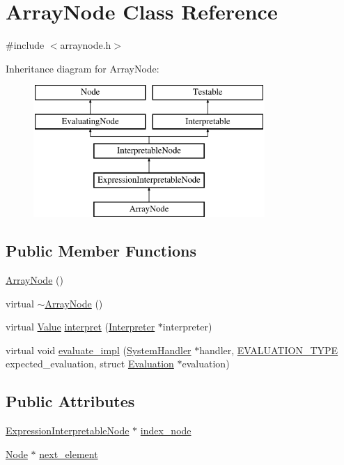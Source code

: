 \hypertarget{classArrayNode}{}\section{Array\+Node Class Reference}
\label{classArrayNode}


{\ttfamily \#include $<$arraynode.\+h$>$}

Inheritance diagram for Array\+Node\+:\begin{figure}[H]
\begin{center}
\leavevmode
\includegraphics[height=5.000000cm]{classArrayNode}
\end{center}
\end{figure}
\subsection*{Public Member Functions}
\begin{DoxyCompactItemize}
\item 
\hyperlink{classArrayNode_adfb4eb2c05953007bb2af001141a2109}{Array\+Node} ()
\item 
virtual \hyperlink{classArrayNode_aa45e4fbc84eab2f8731feefdc99bd639}{$\sim$\+Array\+Node} ()
\item 
virtual \hyperlink{classValue}{Value} \hyperlink{classArrayNode_a029220b946233e22cb661fcfac9634d0}{interpret} (\hyperlink{classInterpreter}{Interpreter} $\ast$interpreter)
\item 
virtual void \hyperlink{classArrayNode_aeefbfe735ed37a81785a492dbc66eddc}{evaluate\+\_\+impl} (\hyperlink{classSystemHandler}{System\+Handler} $\ast$handler, \hyperlink{statics_8h_a6664c451ca7787483a7981cc1de68dbb}{E\+V\+A\+L\+U\+A\+T\+I\+O\+N\+\_\+\+T\+Y\+PE} expected\+\_\+evaluation, struct \hyperlink{structEvaluation}{Evaluation} $\ast$evaluation)
\end{DoxyCompactItemize}
\subsection*{Public Attributes}
\begin{DoxyCompactItemize}
\item 
\hyperlink{classExpressionInterpretableNode}{Expression\+Interpretable\+Node} $\ast$ \hyperlink{classArrayNode_a949140f67149544aec59044dcae07036}{index\+\_\+node}
\item 
\hyperlink{classNode}{Node} $\ast$ \hyperlink{classArrayNode_aa3bccfaecfe5597fd494ee56cae918dd}{next\+\_\+element}
\end{DoxyCompactItemize}
